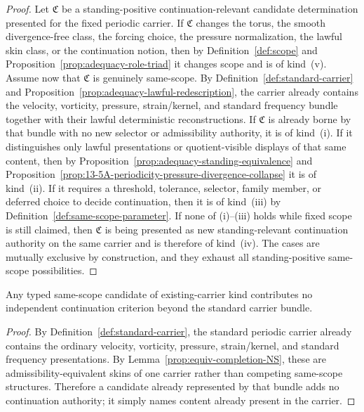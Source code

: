 \begin{proof}
Let $\mathfrak C$ be a standing-positive continuation-relevant candidate determination presented for the fixed periodic carrier.
If $\mathfrak C$ changes the torus, the smooth divergence-free class, the forcing choice, the
pressure normalization, the lawful skin class, or the continuation notion, then by
Definition~\ref{def:scope} and Proposition~\ref{prop:adequacy-role-triad} it changes scope and is of
kind~(v). Assume now that $\mathfrak C$ is genuinely same-scope. By
Definition~\ref{def:standard-carrier} and Proposition~\ref{prop:adequacy-lawful-redescription}, the
carrier already contains the velocity, vorticity, pressure, strain/kernel, and standard frequency
bundle together with their lawful deterministic reconstructions. If $\mathfrak C$ is already borne by
that bundle with no new selector or admissibility authority, it is of kind~(i). If it distinguishes
only lawful presentations or quotient-visible displays of that same content, then by
Proposition~\ref{prop:adequacy-standing-equivalence} and Proposition~\ref{prop:13-5A-periodicity-pressure-divergence-collapse}
it is of kind~(ii). If it requires a threshold, tolerance, selector, family member, or deferred
choice to decide continuation, then it is of kind~(iii) by Definition~\ref{def:same-scope-parameter}.
If none of (i)--(iii) holds while fixed scope is still claimed, then $\mathfrak C$ is being presented
as new standing-relevant continuation authority on the same carrier and is therefore of kind~(iv).
The cases are mutually exclusive by construction, and they exhaust all standing-positive same-scope possibilities.
\end{proof}

\begin{manualproposition}
\label{prop:13-5G-existing-carrier-content-adds-no-gate}
Any typed same-scope candidate of existing-carrier kind contributes no independent continuation
criterion beyond the standard carrier bundle.
\end{manualproposition}

\begin{proof}
By Definition~\ref{def:standard-carrier}, the standard periodic carrier already contains the ordinary
velocity, vorticity, pressure, strain/kernel, and standard frequency presentations. By
Lemma~\ref{prop:equiv-completion-NS}, these are admissibility-equivalent skins of one carrier rather
than competing same-scope structures. Therefore a candidate already represented by that bundle adds no
continuation authority; it simply names content already present in the carrier.
\end{proof}

